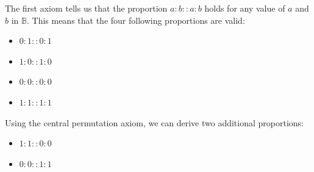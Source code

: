The first axiom tells us that the proportion $a:b::a:b$ holds for any value of
$a$ and $b$ in $\mathbb{B}$. This means that the four following proportions are
valid:
\begin{itemize}
  \item $0 : 1 :: 0 :1$
  \item $1 : 0 :: 1 :0$
  \item $0 : 0 :: 0 :0$
  \item $1 : 1 :: 1 :1$
\end{itemize}

Using the central permutation axiom, we can derive two additional proportions:

\begin{itemize}
  \item $1 : 1 :: 0 : 0$
  \item $0 : 0 :: 1 : 1$
\end{itemize}

